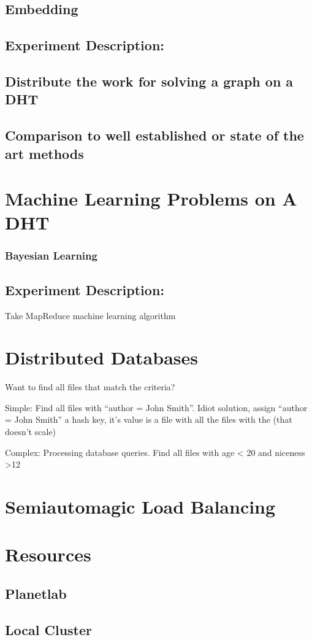 \documentclass[10pt,letterpaper,twoside]{report}
\begin{document}
\subsection{Embedding}

\subsection{Experiment Description:}
\subsection{Distribute the work for solving a graph on a DHT}
\subsection{Comparison to well established or state of the art methods}



\section{Machine Learning Problems on A DHT}


\subsubsection{Bayesian Learning}
\subsection{Experiment Description:}
Take MapReduce machine learning algorithm

\section{Distributed Databases}


Want to find all files that match the criteria?

Simple: Find all files with ``author = John Smith''.  Idiot solution, assign ``author = John Smith'' a hash key,  it's value is a file with all the files with the (that doesn't scale) 


Complex: Processing database queries.   Find all files with age < 20 and niceness >12


\section{Semiautomagic Load Balancing}

\section{Resources}
\subsection{Planetlab}
\subsection{Local Cluster}





\end{document}
